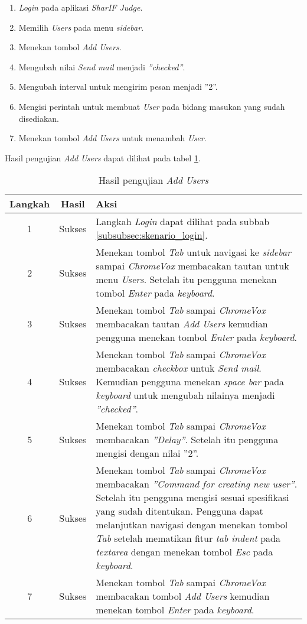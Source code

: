 \begin{enumerate}
	\item \textit{Login} pada aplikasi \textit{SharIF Judge}.
	\item Memilih \textit{Users} pada menu \textit{sidebar}.
	\item Menekan tombol \textit{Add Users}.
	\item Mengubah nilai \textit{Send mail} menjadi \textit{''checked''}.
	\item Mengubah interval untuk mengirim pesan menjadi ''2''.
	\item Mengisi perintah untuk membuat \textit{User} pada bidang masukan yang sudah disediakan.
	\item Menekan tombol \textit{Add Users} untuk menambah \textit{User}.
\end{enumerate}

Hasil pengujian \textit{Add Users} dapat dilihat pada tabel \ref{tab:hasil_add_users}.

\begin{table}[H]
	\centering
	\caption{Hasil pengujian \textit{Add Users}}
	\label{tab:hasil_add_users}
	\begin{tabular}{|c|c|p{12cm}|}
		\toprule
		Langkah & Hasil & Aksi\\
		\midrule
		1 & Sukses & Langkah \textit{Login} dapat dilihat pada subbab \ref{subsubsec:skenario_login}.\\
		2 & Sukses & Menekan tombol \textit{Tab} untuk navigasi ke \textit{sidebar} sampai \textit{ChromeVox} membacakan tautan untuk menu \textit{Users}. Setelah itu pengguna menekan tombol \textit{Enter} pada \textit{keyboard}.\\
		3 & Sukses & Menekan tombol \textit{Tab} sampai \textit{ChromeVox} membacakan tautan \textit{Add Users} kemudian pengguna menekan tombol \textit{Enter} pada \textit{keyboard}.\\
		4 & Sukses & Menekan tombol \textit{Tab} sampai \textit{ChromeVox} membacakan \textit{checkbox} untuk \textit{Send mail}. Kemudian pengguna menekan \textit{space bar} pada \textit{keyboard} untuk mengubah nilainya menjadi \textit{''checked''}.\\
		5 & Sukses & Menekan tombol \textit{Tab} sampai \textit{ChromeVox} membacakan \textit{''Delay''}. Setelah itu pengguna mengisi dengan nilai ''2''.\\
		6 & Sukses & Menekan tombol \textit{Tab} sampai \textit{ChromeVox} membacakan \textit{''Command for creating new user''}. Setelah itu pengguna mengisi sesuai spesifikasi yang sudah ditentukan. Pengguna dapat melanjutkan navigasi dengan menekan tombol \textit{Tab} setelah mematikan fitur \textit{tab indent} pada \textit{textarea} dengan menekan tombol \textit{Esc} pada \textit{keyboard}.\\
		7 & Sukses & Menekan tombol \textit{Tab} sampai \textit{ChromeVox} membacakan tombol \textit{Add Users} kemudian menekan tombol \textit{Enter} pada \textit{keyboard}.\\
		\bottomrule
	\end{tabular}
\end{table}

